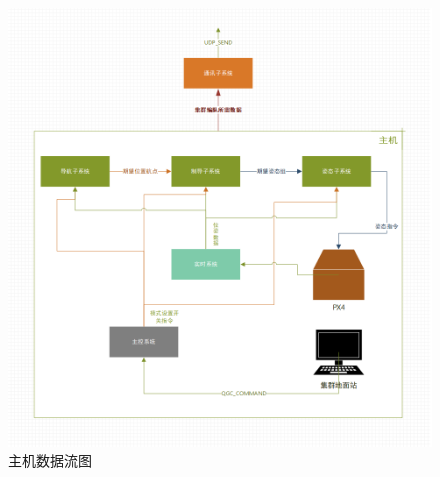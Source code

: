         \begin{figure}
          \centering
          \includegraphics[width=\textwidth]{pictures/leader.png}
          \caption{主机数据流图}
          \label{fig:leader}
        \end{figure}
